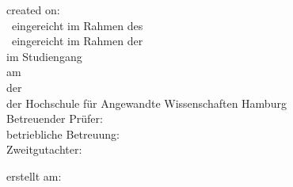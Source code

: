 {\begin{textblock*}{\textwidth}
\begin{minipage}[b]{\textwidth}
        created on: \ISubDate \\
      \else
      	\ifdefined\IisInternshipReport
        \IthesisKindDE ~eingereicht im Rahmen des \IthesisExaminationDE \\	
	\else
        \IthesisKindDE ~eingereicht im Rahmen der \IthesisExaminationDE \\
        \fi
	im Studiengang \textit{\IstudyCourseName} \\
        am \IthesisDepartmentFull \\
        der \IthesisFacultyFull \\
        der Hochschule für Angewandte Wissenschaften Hamburg\\

        Betreuender Prüfer: \IfirstSv \\
        \ifdefined\IisTermPaper
        \else
          \ifdefined\IisInternshipReport
        betriebliche Betreuung: \IsecondSv \\							
	  \else
        Zweitgutachter: \\
        \fi\fi

        erstellt am: \ISubDate \\
      \fi
    \end{minipage}
  \end{textblock*}
}
